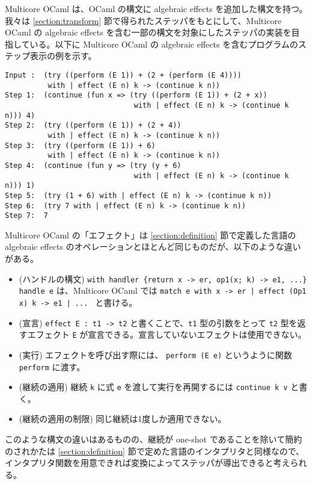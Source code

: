 Multicore OCaml は、OCaml の構文に algebraic effects を追加した構文を持つ。我々は \ref{section:transform} 節で得られたステッパをもとにして、Multicore OCaml の algebraic effects を含む一部の構文を対象にしたステッパの実装を目指している。以下に Multicore OCaml の algebraic effects を含むプログラムのステップ表示の例を示す。

\begin{verbatim}
Input :  (try ((perform (E 1)) + (2 + (perform (E 4))))
          with | effect (E n) k -> (continue k n))
Step 1:  (continue (fun x => (try ((perform (E 1)) + (2 + x))
                              with | effect (E n) k -> (continue k n))) 4)
Step 2:  (try ((perform (E 1)) + (2 + 4))
          with | effect (E n) k -> (continue k n))
Step 3:  (try ((perform (E 1)) + 6)
          with | effect (E n) k -> (continue k n))
Step 4:  (continue (fun y => (try (y + 6)
                              with | effect (E n) k -> (continue k n))) 1)
Step 5:  (try (1 + 6) with | effect (E n) k -> (continue k n))
Step 6:  (try 7 with | effect (E n) k -> (continue k n))
Step 7:  7
\end{verbatim}

Multicore OCaml の「エフェクト」は \ref{section:definition} 節で定義した言語の algebraic effects のオペレーションとほとんど同じものだが、以下のような違いがある。

\begin{itemize}
\item (ハンドルの構文) \texttt{with handler \{return x -> er, op1(x; k) -> e1, ...\} handle e} は、Multicore OCaml では \texttt{match e with x -> er | effect (Op1 x) k -> e1 | ... } と書ける。
\item (宣言) \texttt{effect E : t1 -> t2} と書くことで、\texttt{t1} 型の引数をとって \texttt{t2} 型を返すエフェクト \texttt{E} が宣言できる。宣言していないエフェクトは使用できない。
\item (実行) エフェクトを呼び出す際には、 \texttt{perform (E e)} というように関数 \texttt{perform} に渡す。
\item (継続の適用) 継続 \texttt{k} に式 \texttt{e} を渡して実行を再開するには \texttt{continue k v} と書く。
\item (継続の適用の制限) 同じ継続は1度しか適用できない。
\end{itemize}

このような構文の違いはあるものの、継続が one-shot であることを除いて簡約のされかたは \ref{section:definition} 節で定めた言語のインタプリタと同様なので、インタプリタ関数を用意できれば変換によってステッパが導出できると考えられる。
